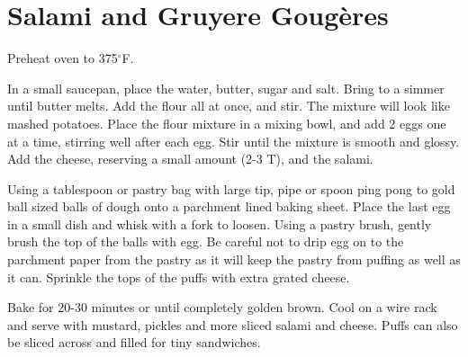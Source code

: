 \section{Salami and Gruyere Goug\`{e}res}
\begin{recipe}
	
	
	
	Preheat oven to 375$^{\circ}$F. 
	
	In a small saucepan, place the water, butter, sugar and salt.  Bring to a simmer until butter melts.  Add the flour all at once, and stir.  The mixture will look like mashed potatoes.   Place the flour mixture in a mixing bowl, and add 2 eggs one at a time, stirring well after each egg.  Stir until the mixture is smooth and glossy.  Add the cheese, reserving a small amount (2-3 T), and the salami.
	
	Using a tablespoon or pastry bag with large tip, pipe or spoon ping pong to gold ball sized balls of dough onto a parchment lined baking sheet.  Place the last egg in a small dish and whisk with a fork to loosen.  Using a pastry brush, gently brush the top of the balls with egg.  Be careful not to drip egg on to the parchment paper from the pastry as it will keep the pastry from puffing as well as it can.  Sprinkle the tops of the puffs with extra grated cheese.
	
	Bake for 20-30 minutes or until completely golden brown. Cool on a wire rack and serve with mustard, pickles and more sliced salami and cheese.  Puffs can also be sliced across and filled for tiny sandwiches.
	
\end{recipe}
